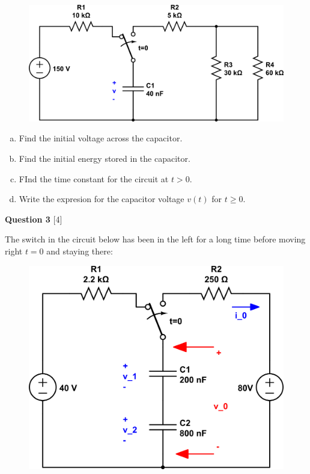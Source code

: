 \documentclass[12pt]{article}
\begin{document}
\begin{figure}[h!]
\begin{center}
 \includegraphics[scale=0.4]{p7_21.png}
\end{center}
\end{figure}

\begin{enumerate}[(a)]
\item Find the initial voltage across the capacitor.
\item Find the initial energy stored in the capacitor.
\item FInd the time constant for the circuit at $t > 0$.
\item Write the expresion for the capacitor voltage $v(t)$ for $t \geq 0$.
\end{enumerate}

\newpage

{\bf Question 3} [4] %

The switch in the circuit below has been in the left for a long time before moving right $t=0$ and staying there:

\begin{figure}[h!]
\begin{center}
 \includegraphics[scale=0.3]{p7_64.png}
\end{center}
\end{figure}
\end{document}
